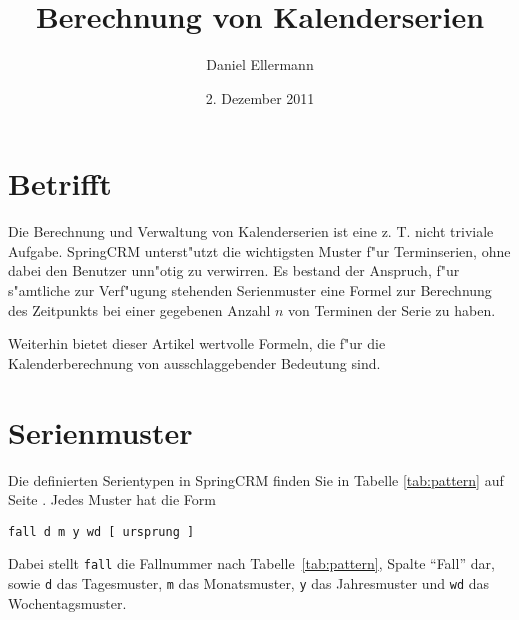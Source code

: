 \documentclass[a4paper]{article}
\title{Berechnung von Kalenderserien}
\author{Daniel Ellermann}
\date{2. Dezember 2011}
\numberwithin{equation}{section}
\begin{document}
\maketitle
\tableofcontents



%
%
%
%
\section{Betrifft}
Die Berechnung und Verwaltung von Kalenderserien ist eine z. T. nicht triviale
Aufgabe. SpringCRM unterst"utzt die wichtigsten Muster f"ur Terminserien, ohne
dabei den Benutzer unn"otig zu verwirren. Es bestand der Anspruch, f"ur
s"amtliche zur Verf"ugung stehenden Serienmuster eine Formel zur Berechnung
des Zeitpunkts bei einer gegebenen Anzahl $n$ von Terminen der Serie zu haben.

Weiterhin bietet dieser Artikel wertvolle Formeln, die f"ur die
Kalenderberechnung von ausschlaggebender Bedeutung sind.



%
%
%
%
\section{Serienmuster}
Die definierten Serientypen in SpringCRM finden Sie in Tabelle
\ref{tab:pattern} auf Seite \pageref{tab:pattern}. Jedes Muster hat die Form

\vspace{8pt}
\texttt{fall d m y wd [ ursprung ]}
\vspace{8pt}

\noindent Dabei stellt \texttt{fall} die Fallnummer nach
Tabelle~\ref{tab:pattern}, Spalte "`Fall"' dar, sowie \texttt{d} das
Tagesmuster, \texttt{m} das Monatsmuster, \texttt{y} das Jahresmuster und
\texttt{wd} das Wochentagsmuster.
\end{document}
